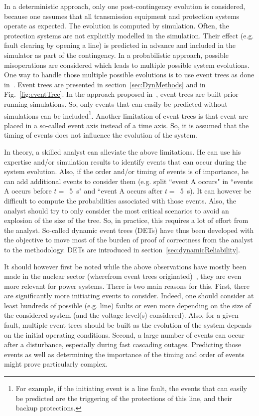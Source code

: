In a deterministic approach, only one post-contingency evolution is considered, because one assumes that all transmission equipment and protection systems operate as expected. The evolution is computed by simulation. Often, the protection systems are not explicitly modelled in the simulation. Their effect (e.g. fault clearing by opening a line) is predicted in advance and included in the simulator as part of the contingency. In a probabilistic approach, possible misoperations are considered which leads to multiple possible system evolutions. One way to handle those multiple possible evolutions is to use event trees as done in~\cite{Haarla, GridPSA}. Event trees are presented in section~\ref{sec:DynMethods} and in Fig.~\ref{fig:eventTree}. In the approach proposed in~\cite{Haarla, GridPSA}, event trees are built prior running simulations. So, only events that can easily be predicted without simulations can be included\footnote{For example, if the initiating event is a line fault, the events that can easily be predicted are the triggering of the protections of this line, and their backup protections.}. Another limitation of event trees is that event are placed in a so-called event axis instead of a time axis. So, it is assumed that the timing of events does not influence the evolution of the system.

In theory, a skilled analyst can alleviate the above limitations. He can use his expertise and/or simulation results to identify events that can occur during the system evolution. Also, if the order and/or timing of events is of importance, he can add additional events to consider them (e.g. split ``event A occurs" in ``events A occurs before \(t=\)~5~s" and ``event A occurs after \(t=\)~5~s). It can however be difficult to compute the probabilities associated with those events. Also, the analyst should try to only consider the most critical scenarios to avoid an explosion of the size of the tree. So, in practice, this requires a lot of effort from the analyst. So-called dynamic event trees (DETs) have thus been developed with the objective to move most of the burden of proof of correctness from the analyst to the methodology. DETs are introduced in section~\ref{sec:dynamicReliability}.

It should however first be noted while the above observations have mostly been made in the nuclear sector (wherefrom event trees originated)~\cite{LabeauTowards}, they are even more relevant for power systems. There is two main reasons for this. First, there are significantly more initiating events to consider. Indeed, one should consider at least hundreds of possible (e.g. line) faults or even more depending on the size of the considered system (and the voltage level(s) considered). Also, for a given fault, multiple event trees should be built as the evolution of the system depends on the initial operating conditions. Second, a large number of events can occur after a disturbance, especially during fast cascading outages. Predicting those events as well as determining the importance of the timing and order of events might prove particularly complex.

